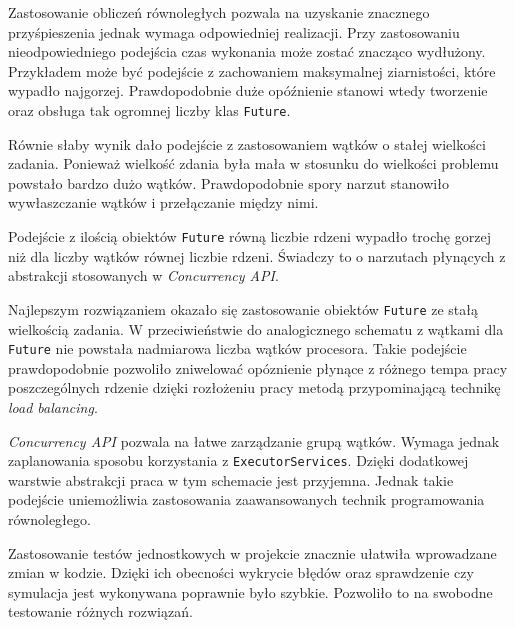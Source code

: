\documentclass{mwart}
\begin{document}
Zastosowanie obliczeń równoległych pozwala na uzyskanie znacznego przyśpieszenia jednak wymaga odpowiedniej realizacji. Przy zastosowaniu nieodpowiedniego podejścia czas wykonania może zostać znacząco wydłużony. Przykładem może być podejście z zachowaniem maksymalnej ziarnistości, które wypadło najgorzej. Prawdopodobnie duże opóźnienie stanowi wtedy tworzenie oraz obsługa tak ogromnej liczby klas \texttt{Future}.

Równie słaby wynik dało podejście z zastosowaniem wątków o stałej wielkości zadania. Ponieważ wielkość zdania była mała w stosunku do wielkości problemu powstało bardzo dużo wątków. Prawdopodobnie spory narzut stanowiło wywłaszczanie wątków i przełączanie między nimi.

Podejście z ilością obiektów \texttt{Future} równą liczbie rdzeni wypadło trochę gorzej niż dla liczby wątków równej liczbie rdzeni. Świadczy to o narzutach płynących z abstrakcji stosowanych w \textit{Concurrency API}.

Najlepszym rozwiązaniem okazało się zastosowanie obiektów \texttt{Future} ze stałą wielkością zadania. W przeciwieństwie do analogicznego schematu z wątkami dla \texttt{Future} nie powstała nadmiarowa liczba wątków procesora. Takie podejście prawdopodobnie pozwoliło zniwelować opóznienie płynące z różnego tempa pracy poszczególnych rdzenie dzięki rozłożeniu pracy metodą przypominającą technikę \textit{load balancing}.

\vspace{5mm}

\textit{Concurrency API} pozwala na łatwe zarządzanie grupą wątków. Wymaga jednak zaplanowania sposobu korzystania z \texttt{ExecutorServices}. Dzięki dodatkowej warstwie abstrakcji praca w tym schemacie jest przyjemna. Jednak takie podejście uniemożliwia zastosowania zaawansowanych technik programowania równoległego.

\vspace{5mm}

Zastosowanie testów jednostkowych w projekcie znacznie ułatwiła wprowadzane zmian w kodzie. Dzięki ich obecności wykrycie błędów oraz sprawdzenie czy symulacja jest wykonywana poprawnie było szybkie. Pozwoliło to na swobodne testowanie różnych rozwiązań.
\end{document}

